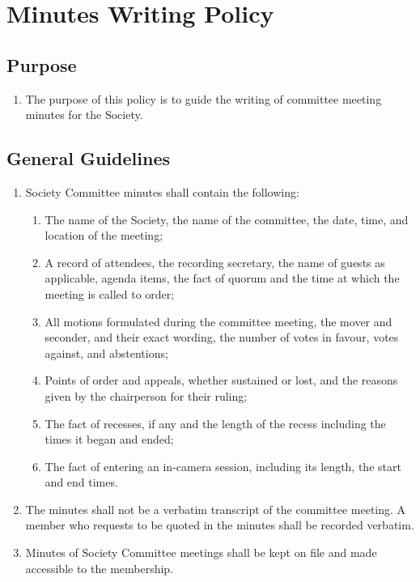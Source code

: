 \section{Minutes Writing Policy}

\subsection{Purpose}
\begin{enumerate} [align=left]
\item The purpose of this policy is to guide the writing of committee meeting minutes for the Society.
\end{enumerate}

\subsection{General Guidelines}
\begin{enumerate} [align=left]
\item Society Committee minutes shall contain the following:
\begin{enumerate} [label*=\arabic*., align=left]
\item The name of the Society, the name of the committee, the date, time, and location of the meeting;
\item A record of attendees, \astfootnote the recording secretary, the name of guests as applicable, agenda items, the fact of quorum and the time at which the meeting is called to order;
\item All motions formulated during the committee meeting, the mover and seconder, and their exact wording, the number of votes in favour, votes against, and abstentions;
\item Points of order and appeals, whether sustained or lost, and the reasons given by the chairperson for their ruling;
\item The fact of recesses, if any and the length of the recess including the times it began and ended;
\item The fact of entering an in-camera session, including its length, the start and end
times.
\end{enumerate}
\item The minutes shall not be a verbatim transcript of the committee meeting. A member who requests to be quoted in the minutes shall be recorded verbatim.
\item Minutes of Society Committee meetings shall be kept on file and made accessible to the membership.
\end{enumerate}